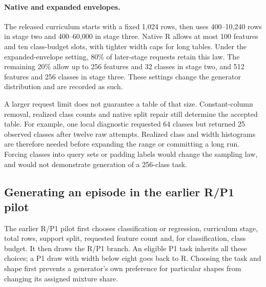\documentclass[11pt]{article}
\begin{document}
\paragraph{Native and expanded envelopes.} The released curriculum starts with a fixed 1,024 rows, then uses 400--10,240 rows in stage two and 400--60,000 in stage three. Native R allows at most 100 features and ten class-budget slots, with tighter width caps for long tables. Under the expanded-envelope setting, 80\% of later-stage requests retain this law. The remaining 20\% allow up to 256 features and 32 classes in stage two, and 512 features and 256 classes in stage three. These settings change the generator distribution and are recorded as such.

A larger request limit does not guarantee a table of that size. Constant-column removal, realized class counts and native split repair still determine the accepted table. For example, one local diagnostic requested 64 classes but returned 25 observed classes after twelve raw attempts. Realized class and width histograms are therefore needed before expanding the range or committing a long run. Forcing classes into query sets or padding labels would change the sampling law, and would not demonstrate generation of a 256-class task.


\subsection{Generating an episode in the earlier R/P1 pilot}
\label{sec:prior-walkthrough}

The earlier R/P1 pilot first chooses classification or regression, curriculum stage, total rows, support split, requested feature count and, for classification, class budget. It then draws the R/P1 branch. An eligible P1 task inherits all these choices; a P1 draw with width below eight goes back to R. Choosing the task and shape first prevents a generator's own preference for particular shapes from changing its assigned mixture share.
\end{document}
